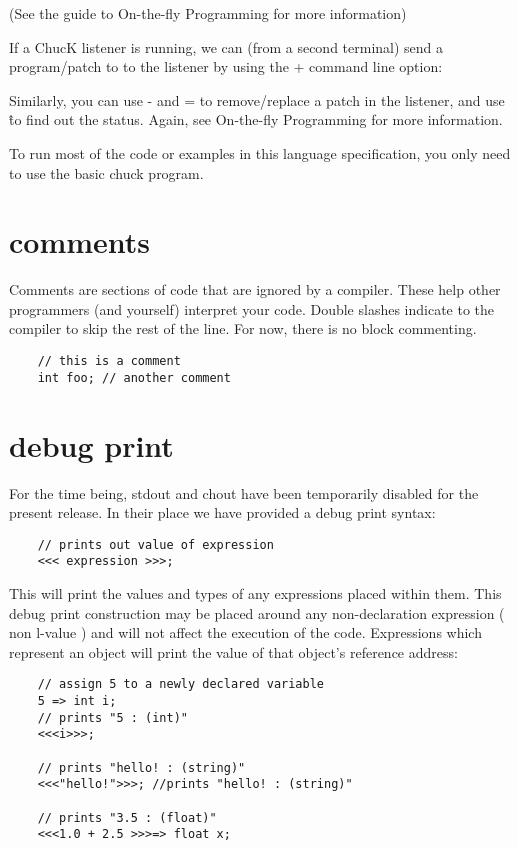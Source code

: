 (See the guide to On-the-fly Programming for more information)

If a ChucK listener is running, we can (from a second terminal) send a program/patch to to the listener by using the + command line option:

Similarly, you can use - and = to remove/replace a patch in the listener, and use \^ to find out the status. Again, see On-the-fly Programming for more information.

To run most of the code or examples in this language specification, you only need to use the basic chuck program.
 

\section{comments}

Comments are sections of code that are ignored by a compiler. These help other programmers (and yourself) interpret your code. Double slashes indicate to the compiler to skip the rest of the line. For now, there is  no block commenting.
\begin{verbatim}
    // this is a comment
    int foo; // another comment
\end{verbatim}
 

\section{debug print}

For the time being, stdout and chout have been temporarily disabled for the present release. In their place we have provided a debug print syntax:
\begin{verbatim}
    // prints out value of expression
    <<< expression >>>;
\end{verbatim}

This will print the values and types of any expressions placed within them. This debug print construction may be placed around any non-declaration expression ( non l-value ) and will not affect the execution of the code. Expressions which represent an object will print the value of that object's reference address:
\begin{verbatim}
    // assign 5 to a newly declared variable
    5 => int i;
    // prints "5 : (int)"
    <<<i>>>;

    // prints "hello! : (string)"
    <<<"hello!">>>; //prints "hello! : (string)"

    // prints "3.5 : (float)"
    <<<1.0 + 2.5 >>>=> float x;
\end{verbatim}

